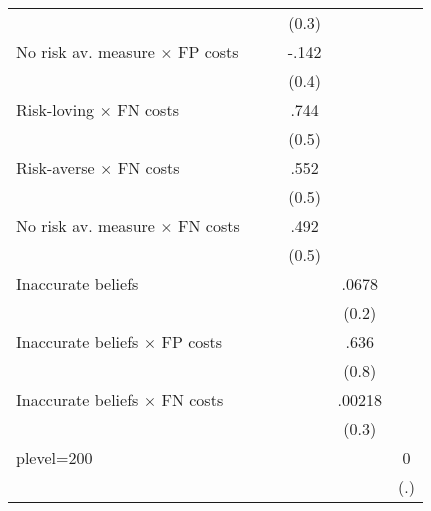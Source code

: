 \begin{table}[H]
\begin{tabular}{l*{5}{c}}
                &                  &                  &    (0.3)         &                  &                  \\
No risk av. measure $\times$ FP costs&                  &                  &    -.142         &                  &                  \\
                &                  &                  &    (0.4)         &                  &                  \\
Risk-loving $\times$ FN costs&                  &                  &     .744         &                  &                  \\
                &                  &                  &    (0.5)         &                  &                  \\
Risk-averse $\times$ FN costs&                  &                  &     .552         &                  &                  \\
                &                  &                  &    (0.5)         &                  &                  \\
No risk av. measure $\times$ FN costs&                  &                  &     .492         &                  &                  \\
                &                  &                  &    (0.5)         &                  &                  \\
Inaccurate beliefs&                  &                  &                  &    .0678         &                  \\
                &                  &                  &                  &    (0.2)         &                  \\
Inaccurate beliefs $\times$ FP costs&                  &                  &                  &     .636         &                  \\
                &                  &                  &                  &    (0.8)         &                  \\
Inaccurate beliefs $\times$ FN costs&                  &                  &                  &   .00218         &                  \\
                &                  &                  &                  &    (0.3)         &                  \\
plevel=200      &                  &                  &                  &                  &        0         \\
                &                  &                  &                  &                  &      (.)         \\

\end{tabular}
\end{table}
